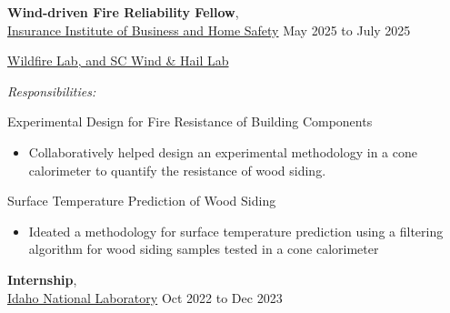 \documentclass[10pt]{article}
\begin{document}
\textbf{Wind-driven Fire Reliability Fellow}, \\
\href{ttps://ibhs.org/}{Insurance Institute of Business and Home Safety}
\hfill {May 2025 to July 2025}

\begin{innerlist}
	\item[] \href{https://ibhs.org/risk-research/wildfire/}{Wildfire Lab, and SC Wind \& Hail Lab} \\
	\begin{innerlist}
		\item \textit{Responsibilities:}
		\begin{innerlist}
			\item Experimental Design for Fire Resistance of Building Components
			\begin{itemize}
				\item Collaboratively helped design an experimental methodology in a cone calorimeter to quantify the resistance of wood siding.
			\end{itemize}
			\item Surface Temperature Prediction of Wood Siding
			\begin{itemize}
				\item Ideated a methodology for surface temperature prediction using a filtering algorithm for wood siding samples tested in a cone calorimeter \\
			\end{itemize}
		\end{innerlist}       
	\end{innerlist}
\end{innerlist}


\textbf{Internship}, \\
\href{https://inl.gov/}{Idaho National Laboratory}
\hfill {Oct 2022 to Dec 2023}
\end{document}
